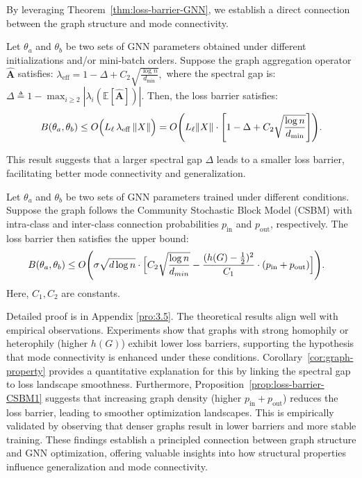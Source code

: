 By leveraging Theorem~\ref{thm:loss-barrier-GNN}, we establish a direct connection between the graph structure and mode connectivity.

\begin{corollary}
\label{cor:graph-property}
Let \(\theta_a\) and \(\theta_b\) be two sets of GNN parameters obtained under different initializations and/or mini-batch orders. Suppose the graph aggregation operator \(\hat{\mathbf{A}}\) satisfies:
\(
\lambda_{\mathrm{eff}} = 1 - \Delta + C_2 \sqrt{\frac{\log n}{d_{\min}}},
\)
where the spectral gap is:
\(
\Delta \triangleq 1 - \max_{i\ge 2} |\lambda_i(\mathbb{E}[\hat{\mathbf{A}}])|.
\)
Then, the loss barrier satisfies:
\[
B(\theta_a,\theta_b) \le O\Bigl( L_\ell\, \lambda_{\mathrm{eff}}\, \|X\| \Bigr)
= O\Biggl( L_\ell\|X\|\cdot \left[1 - \Delta + C_2 \sqrt{\frac{\log n}{d_{\min}}}\right]  \Biggr).
\]
\end{corollary}

This result suggests that a larger spectral gap \(\Delta\) leads to a smaller loss barrier, facilitating better mode connectivity and generalization.

\begin{proposition}
\label{prop:loss-barrier-CSBM1}
Let \(\theta_a\) and \(\theta_b\) be two sets of GNN parameters trained under different conditions. Suppose the graph follows the Community Stochastic Block Model (CSBM) with intra-class and inter-class connection probabilities \(p_{\mathrm{in}}\) and \(p_{\mathrm{out}}\), respectively. The loss barrier then satisfies the upper bound:
\begin{equation}
    \begin{aligned}
\label{eq:loss-barrier-community}
B(\theta_a,\theta_b) &\le O\Biggl( \sigma \sqrt{d \log n}\cdot\Bigl[ C_2 \sqrt{\frac{\log n}{d_{min}}} - \frac{(h(G)-\frac{1}{2})^2}{C_1}\cdot(p_{\mathrm{in}} + p_{\mathrm{out}})  \Bigr] \Biggr).
    \end{aligned}
\end{equation}
Here, \(C_1,C_2\) are constants.
\end{proposition}

Detailed proof is in Appendix \ref{pro:3.5}.
The theoretical results align well with empirical observations. Experiments show that graphs with strong homophily or heterophily (higher \(h(G)\)) exhibit lower loss barriers, supporting the hypothesis that mode connectivity is enhanced under these conditions. Corollary~\ref{cor:graph-property} provides a quantitative explanation for this by linking the spectral gap to loss landscape smoothness. Furthermore, Proposition~\ref{prop:loss-barrier-CSBM1} suggests that increasing graph density (higher \( p_{\mathrm{in}} + p_{\mathrm{out}} \)) reduces the loss barrier, leading to smoother optimization landscapes. This is empirically validated by observing that denser graphs result in lower barriers and more stable training. These findings establish a principled connection between graph structure and GNN optimization, offering valuable insights into how structural properties influence generalization and mode connectivity.


